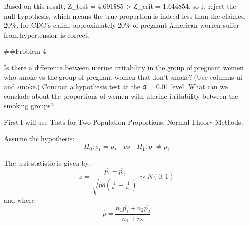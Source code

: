 \documentclass[
]{article}
\begin{document}
Based on this result, \textbar Z\_test\textbar{} = 4.691685
\textgreater{} Z\_crit = 1.644854, so it reject the null hypothesis,
which means the true proportion is indeed less than the claimed 20\%.
for CDC's claim, approximately 20\% of pregnant American women suffer
from hypertension is correct.

\#\#Problem 4

Is there a difference between uterine irritability in the group of
pregnant women who smoke vs the group of pregnant women that don't
smoke? (Use columns ui and smoke.) Conduct a hypothesis test at the 𝛼 =
0.01 level. What can we conclude about the proportions of women with
uterine irritability between the smoking groups?

First I will use Tests for Two-Population Proportions, Normal Theory
Methods:

Assume the hypothesis:
\[H_0 : p_1 = p_2 \quad vs \quad H_1 : p_1 \ne p_2\]

The test statistic is given by:
\[z = {\frac{\hat{p_1} - \hat{p_2}}{\sqrt{\hat{p}\hat{q}(\frac{1}{n_1}+\frac{1}{n_2})}}}\sim N(0,1)\]
and where \[\hat{p} = \frac{n_1\hat{p_1}+n_2\hat{p_2}}{n_1+n_2}\]
\end{document}
